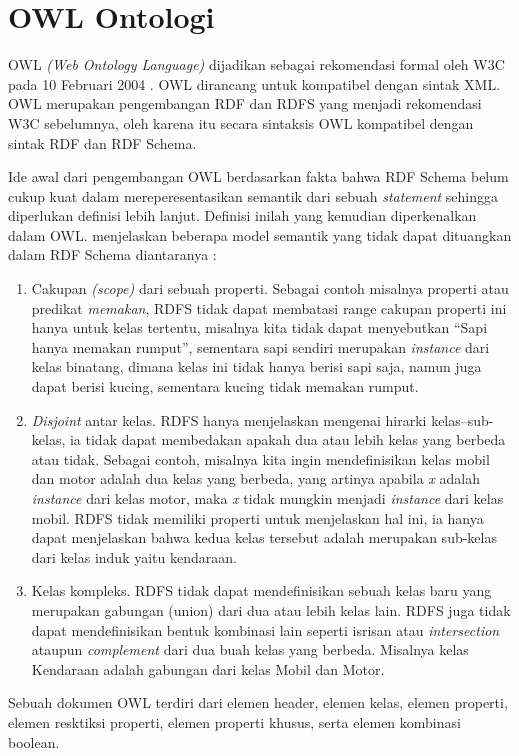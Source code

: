\section{OWL Ontologi}
OWL \emph{(Web Ontology Language)} dijadikan sebagai rekomendasi formal oleh W3C pada 10 Februari 2004 \citep{liyang_yu}. OWL dirancang untuk kompatibel dengan sintak XML. OWL merupakan pengembangan RDF dan RDFS yang menjadi rekomendasi W3C sebelumnya, oleh karena itu secara sintaksis OWL kompatibel dengan sintak RDF dan RDF Schema.

Ide awal dari pengembangan OWL berdasarkan fakta bahwa RDF Schema belum cukup kuat dalam mereperesentasikan semantik dari sebuah \emph{statement} sehingga diperlukan definisi lebih lanjut. Definisi inilah yang kemudian diperkenalkan dalam OWL. \citet*{antoniou} menjelaskan beberapa model semantik yang tidak dapat dituangkan dalam RDF Schema diantaranya :
\begin{enumerate}
	\item Cakupan \emph{(scope)} dari sebuah properti. Sebagai contoh misalnya properti atau predikat \textit{memakan}, RDFS tidak dapat membatasi range cakupan properti ini hanya untuk kelas tertentu, misalnya kita tidak dapat menyebutkan ``Sapi hanya memakan rumput'', sementara sapi sendiri merupakan \emph{instance} dari kelas binatang, dimana kelas ini tidak hanya berisi sapi saja, namun juga dapat berisi kucing, sementara kucing tidak memakan rumput.
	\item \emph{Disjoint} antar kelas. RDFS hanya menjelaskan mengenai hirarki kelas--sub-kelas, ia tidak dapat membedakan apakah dua atau lebih kelas yang berbeda atau tidak. Sebagai contoh, misalnya kita ingin mendefinisikan kelas mobil dan motor adalah dua kelas yang berbeda, yang artinya apabila \emph{x} adalah \emph{instance} dari kelas motor, maka \emph{x} tidak mungkin menjadi \emph{instance} dari kelas mobil. RDFS tidak memiliki properti untuk menjelaskan hal ini, ia hanya dapat menjelaskan bahwa kedua kelas tersebut adalah merupakan sub-kelas dari kelas induk yaitu kendaraan.
	\item Kelas kompleks. RDFS tidak dapat mendefinisikan sebuah kelas baru yang merupakan gabungan (union) dari dua atau lebih kelas lain. RDFS juga tidak dapat mendefinisikan bentuk kombinasi lain seperti isrisan atau \emph{intersection} ataupun \emph{complement} dari dua buah kelas yang berbeda. Misalnya kelas Kendaraan adalah gabungan dari kelas Mobil dan Motor.
\end{enumerate}
Sebuah dokumen OWL terdiri dari elemen header, elemen kelas, elemen properti, elemen resktiksi properti, elemen properti khusus, serta elemen kombinasi boolean. 

